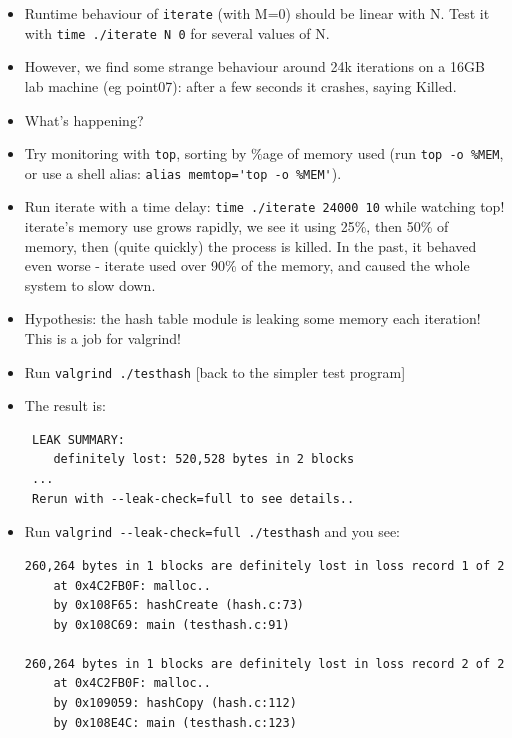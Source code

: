 \documentclass[aspectratio=169]{beamer}
\newcommand{\pitem}{\pause \item}
\begin{document}
\begin{frame}[fragile]
    \begin{itemize}

    \item
      Runtime behaviour of \verb+iterate+ (with M=0) \alert{should be linear with N}.
      Test it with \verb+time ./iterate N 0+ for several values of N.
    \pitem
      However, we find \alert{some strange behaviour} around 24k
      iterations on a 16GB lab machine (eg point07):
      \pause
      after a few seconds it crashes, saying \alert{Killed}.
    \item
      What's happening?
    \pitem
      Try monitoring with \verb+top+, sorting by \%age of memory used (run \verb+top -o %MEM+, or use a shell alias: \verb+alias memtop='top -o %MEM'+).
    \pause
    \item
      Run iterate with a time delay: \verb+time ./iterate 24000 10+
      while watching top!
      \pause
      iterate's memory use
      \alert{grows rapidly}, we see it using 25\%, then 50\% of memory,
      then (quite quickly) \alert{the process is killed}.
      In the past, it behaved even worse - iterate used \alert{over 90\%}
      of the memory, and caused the whole system to slow down.
    \pitem
      Hypothesis: the hash table module is leaking some memory each iteration!
      \pause
      This is a job for valgrind!
    \end{itemize}
\end{frame}

\begin{frame}[fragile]
    \begin{itemize}
    \item
      Run \verb+valgrind ./testhash+ [back to the simpler test program]
    \pitem
      The result is:
\begin{verbatim}
 LEAK SUMMARY:
    definitely lost: 520,528 bytes in 2 blocks
 ...
 Rerun with --leak-check=full to see details..
\end{verbatim}
    \pause
    \item
      Run \verb+valgrind --leak-check=full ./testhash+ and you see:

\begin{verbatim}
260,264 bytes in 1 blocks are definitely lost in loss record 1 of 2
    at 0x4C2FB0F: malloc..
    by 0x108F65: hashCreate (hash.c:73)
    by 0x108C69: main (testhash.c:91)
 
260,264 bytes in 1 blocks are definitely lost in loss record 2 of 2
    at 0x4C2FB0F: malloc..
    by 0x109059: hashCopy (hash.c:112)
    by 0x108E4C: main (testhash.c:123)
\end{verbatim}

  \end{itemize}
\end{frame}
\end{document}
